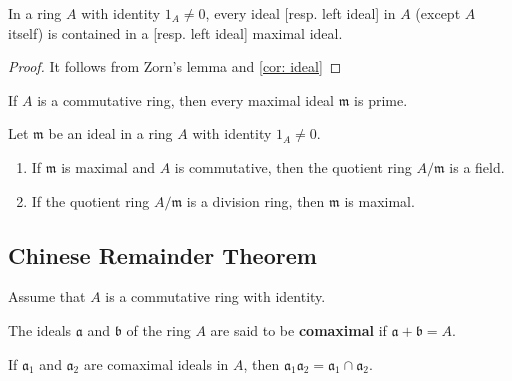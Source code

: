 \begin{theorem}
    In a ring $A$ with identity $1_A\neq 0$, every ideal [resp. left ideal] in $A$ (except $A$ itself) is contained in a [resp. left ideal] maximal ideal.
    \label{thm: existence of maximal ideal}
    \begin{proof}
        It follows from Zorn's lemma and \cref{cor: ideal}
    \end{proof}
\end{theorem}

\begin{theorem}
    \label{thm: maximal ideal is prime}
    If $A$ is a commutative ring, then every maximal ideal $\mathfrak{m}$ is prime.
\end{theorem}


\begin{theorem}
    \label{thm: maximal ideal}
    Let $\mathfrak{m}$ be an ideal in a ring $A$ with identity $1_A \neq 0$.
    \begin{enumerate}
        \item
              If $\mathfrak{m}$ is maximal and $A$ is commutative, then the quotient ring $A / \mathfrak{m}$ is a field.

        \item
              If the quotient ring $A / \mathfrak{m}$ is a division ring, then $\mathfrak{m}$ is maximal.
    \end{enumerate}
\end{theorem}



\subsection{Chinese Remainder Theorem}
Assume that $A$ is a commutative ring with identity.
\begin{definition}
    The ideals $\mathfrak{a}$ and $\mathfrak{b}$ of the ring $A$ are said to be \textbf{comaximal} if $\mathfrak{a}+\mathfrak{b}=A$.
\end{definition}

\begin{lemma}
    If $\mathfrak{a}_1$ and $\mathfrak{a}_2$ are comaximal ideals in $A$, then $\mathfrak{a}_1 \mathfrak{a}_2=\mathfrak{a}_1 \cap \mathfrak{a}_2$.
\end{lemma}

